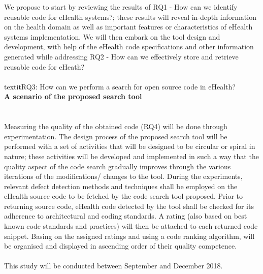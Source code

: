 \documentclass[a4paper]{article}
\begin{document}
We propose to start by reviewing the results of RQ1 - How can we identify reusable code for eHealth systems?; these results will reveal in-depth information on the health domain as well as important features or characteristics of eHealth systems implementation. We will then embark on the tool design and development, with help of the eHealth code specifications and other information generated while addressing RQ2 - How can we effectively store and retrieve reusable code for eHeath? \\ \\
textit{RQ3: How can we perform a search for open source code in eHealth?} \\
\textbf{A scenario of the proposed search tool} \\

\\ \\
Measuring the quality of the obtained code (RQ4) will be done through experimentation. The design process of the proposed search tool will be performed with a set of activities that will be designed to be circular or spiral in nature; these activities will be developed and implemented in such a way that the quality aspect of the code search gradually improves through the various iterations of the modifications/ changes to the tool. During the experiments, relevant defect detection methods and techniques shall be employed on the eHealth source code to be fetched by the code search tool proposed. Prior to returning source code, eHealth code detected by the tool shall be checked for its adherence to architectural and coding standards. A rating (also based on best known code standards and practices) will then be attached to each returned code snippet. Basing on the assigned ratings and using a code ranking algorithm, will be organised and displayed in ascending order of their quality competence.  \\ \\This study will be conducted between September and December 2018.
\vspace{-10pt}
\end{document}
